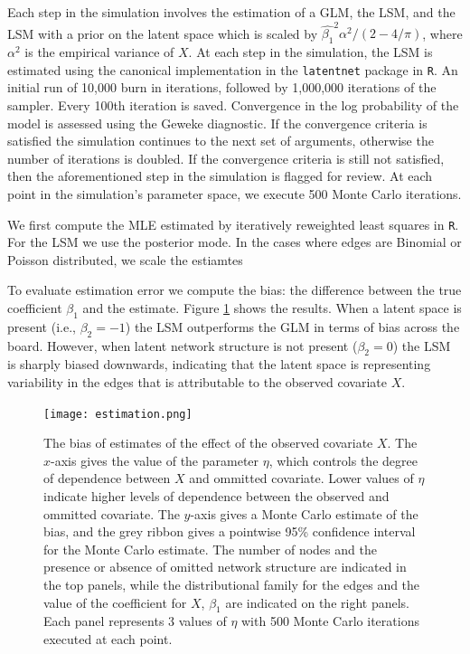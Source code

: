 \documentclass[12pt]{article}
\begin{document}
Each step in the simulation involves the estimation of a GLM, the LSM, and the LSM with a prior on the latent space which is scaled by $\hat{\beta_1}^2\alpha^2/(2-4/\pi)$, where $\alpha^2$ is the empirical variance of $X$. At each step in the simulation, the LSM is estimated using the canonical implementation in the \texttt{latentnet} package in \texttt{R}. An initial run of 10,000 burn in iterations, followed by 1,000,000 iterations of the sampler. Every 100th iteration is saved. Convergence in the log probability of the model is assessed using the Geweke diagnostic. If the convergence criteria is satisfied the simulation continues to the next set of arguments, otherwise the number of iterations is doubled. If the convergence criteria is still not satisfied, then the aforementioned step in the simulation is flagged for review. At each point in the simulation's parameter space, we execute 500 Monte Carlo iterations.

We first compute the MLE estimated by iteratively reweighted least squares in \texttt{R}. For the LSM we use the posterior mode. In the cases where edges are Binomial or Poisson distributed, we scale the estiamtes %

To evaluate estimation error we compute the bias: the difference between the true coefficient $\beta_1$ and the estimate. Figure \ref{fig:estimation} shows the results. When a latent space is present (i.e., $\beta_2 = -1$) the LSM outperforms the GLM in terms of bias across the board. However, when latent network structure is not present ($\beta_2 = 0$) the LSM is sharply biased downwards, indicating that the latent space is representing variability in the edges that is attributable to the observed covariate $X$.

\begin{figure}
\texttt{[image: estimation.png]}
\caption{The bias of estimates of the effect of the observed covariate $X$. The $x$-axis gives the value of the parameter $\eta$, which controls the degree of dependence between $X$ and ommitted covariate. Lower values of $\eta$ indicate higher levels of dependence between the observed and ommitted covariate. The $y$-axis gives a Monte Carlo estimate of the bias, and the grey ribbon gives a pointwise 95\% confidence interval for the Monte Carlo estimate. The number of nodes and the presence or absence of omitted network structure are indicated in the top panels, while the distributional family for the edges and the value of the coefficient for $X$, $\beta_1$ are indicated on the right panels. Each panel represents 3 values of $\eta$ with 500 Monte Carlo iterations executed at each point.
\label{fig:estimation}}
\end{figure}
\end{document}
